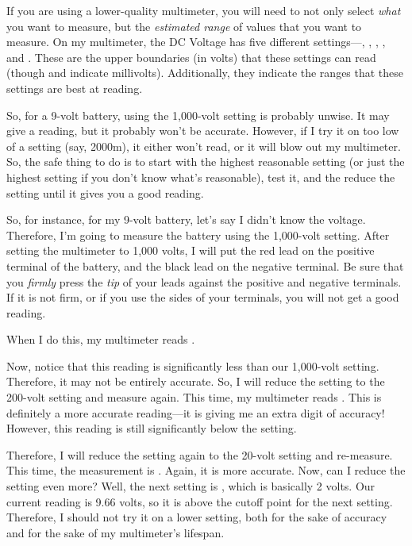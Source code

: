 If you are using a lower-quality multimeter, you will need to not only select \emph{what} you want to measure, but the \emph{estimated range} of values that you want to measure.
On my multimeter, the DC Voltage has five different settings---, , , , and .
These are the upper boundaries (in volts) that these settings can read (though  and  indicate millivolts).
Additionally, they indicate the ranges that these settings are best at reading.

So, for a 9-volt battery, using the 1,000-volt setting is probably unwise.
It may give a reading, but it probably won't be accurate.
However, if I try it on too low of a setting (say, 2000m), it either won't read, or it will blow out my multimeter.
So, the safe thing to do is to start with the highest reasonable setting (or just the highest setting if you don't know what's reasonable), test it, and the reduce the setting until it gives you a good reading.

So, for instance, for my 9-volt battery, let's say I didn't know the voltage.
Therefore, I'm going to measure the battery using the 1,000-volt setting.
After setting the multimeter to 1,000 volts, I will put the red lead on the positive terminal of the battery, and the black lead on the negative terminal.
Be sure that you \emph{firmly} press the \emph{tip} of your leads against the positive and negative terminals.  
If it is not firm, or if you use the sides of your terminals, you will not get a good reading.

When I do this, my multimeter reads .  

Now, notice that this reading is significantly less than our 1,000-volt setting.
Therefore, it may not be entirely accurate.  
So, I will reduce the setting to the 200-volt setting and measure again.
This time, my multimeter reads .
This is definitely a more accurate reading---it is giving me an extra digit of accuracy!
However, this reading is still significantly below the setting.

Therefore, I will reduce the setting again to the 20-volt setting and re-measure.
This time, the measurement is .
Again, it is more accurate.
Now, can I reduce the setting even more?
Well, the next setting is , which is basically 2 volts.
Our current reading is 9.66 volts, so it is above the cutoff point for the next setting.
Therefore, I should not try it on a lower setting, both for the sake of accuracy and for the sake of my multimeter's lifespan.

